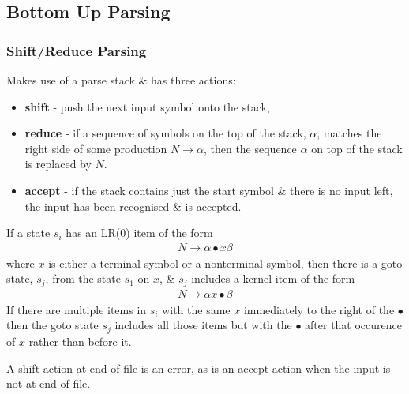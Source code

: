 \subsection{Bottom Up Parsing}

\subsubsection{Shift/Reduce Parsing}
Makes use of a parse stack \& has three actions:
\begin{itemize}
    \item \textbf{shift} - push the next input symbol onto the stack,
    \item \textbf{reduce} - if a sequence of symbols on the top of the stack, $\alpha$, 
    matches the right side of some production $N \rightarrow \alpha$, then the sequence 
    $\alpha$ on top of the stack is replaced by $N$.
    \item \textbf{accept} - if the stack contains just the start symbol \& there is no
    input left, the input has been recognised \& is accepted.
\end{itemize}

If a state $s_i$ has an LR(0) item of the form
\begin{align*}
    N \rightarrow \alpha \bullet x \beta
\end{align*}
where $x$ is either a terminal symbol or a nonterminal symbol, then there is a goto state, 
$s_j$, from the state $s_1$ on $x$, \& $s_j$ includes a kernel item of the form
\begin{align*}
    N \rightarrow \alpha x \bullet \beta
\end{align*}
If there are multiple items in $s_i$ with the same $x$ immediately to the right of the 
$\bullet$ then the goto state $s_j$ includes all those items but with the $\bullet$ after 
that occurence of $x$ rather than before it.

A shift action at end-of-file is an error, as is an accept action when the input is not at 
end-of-file.

